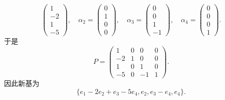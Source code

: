 \documentclass[../../main.tex]{subfiles}
\begin{document}
\begin{solution}
\[\begin{pmatrix}
1 \\
-2 \\
1 \\
-5
\end{pmatrix}, \quad \alpha_2 = \begin{pmatrix}
0 \\
1 \\
0 \\
0
\end{pmatrix}, \quad \alpha_3 = \begin{pmatrix}
0 \\
0 \\
1 \\
-1
\end{pmatrix}, \quad \alpha_4 = \begin{pmatrix}
0 \\
0 \\
0 \\
1
\end{pmatrix}.
\]
于是
\[
P = \begin{pmatrix}
1 & 0 & 0 & 0 \\
-2 & 1 & 0 & 0 \\
1 & 0 & 1 & 0 \\
-5 & 0 & -1 & 1
\end{pmatrix}.
\]
因此新基为
\[
\{e_1 - 2e_2 + e_3 - 5e_4, e_2, e_3 - e_4, e_4\}.
\] 
\end{solution}
\end{document}
